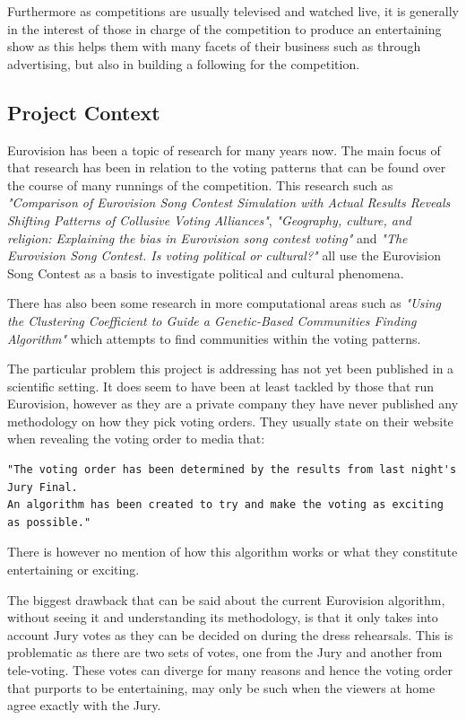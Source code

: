 \documentclass[12pt]{report}
\begin{document}
Furthermore as competitions are usually televised and watched live, it is generally in the interest of those in charge of the competition to produce an entertaining show as this helps them with many facets of their business such as through advertising, but also in building a following for the competition.

\subsection{Project Context}\label{Project Context}
Eurovision has been a topic of research for many years now. The main focus of that research has been in relation to the voting patterns that can be found over the course of many runnings of the competition. This research such as \textit{"Comparison of Eurovision Song Contest Simulation with Actual Results Reveals Shifting Patterns of Collusive Voting Alliances"}\cite{gatherer2006}, \textit{"Geography, culture, and religion: Explaining the bias in Eurovision song contest voting"}\cite{so66198} and \textit{"The Eurovision Song Contest. Is voting political or cultural?"} \cite{Ginsburgh200841} all use the Eurovision Song Contest as a basis to investigate political and cultural phenomena.

There has also been some research in more computational areas such as \textit{"Using the Clustering Coefficient to Guide a Genetic-Based Communities Finding Algorithm"}\cite{Bello2011} which attempts to find communities within the voting patterns.

The particular problem this project is addressing has not yet been published in a scientific setting. It does seem to have been at least tackled by those that run Eurovision, however as they are a private company they have never published any methodology on how they pick voting orders. They usually state on their website\cite{votingOrderQuote} when revealing the voting order to media that:
\begin{verbatim}"The voting order has been determined by the results from last night's Jury Final.
An algorithm has been created to try and make the voting as exciting as possible."
\end{verbatim}
There is however no mention of how this algorithm works or what they constitute entertaining or exciting.

The biggest drawback that can be said about the current Eurovision algorithm, without seeing it and understanding its methodology, is that it only takes into account Jury votes as they can be decided on during the dress rehearsals. This is problematic as there are two sets of votes, one from the Jury and another from tele-voting. These votes can diverge for many reasons and hence the voting order that purports to be entertaining, may only be such when the viewers at home agree exactly with the Jury.
\end{document}
